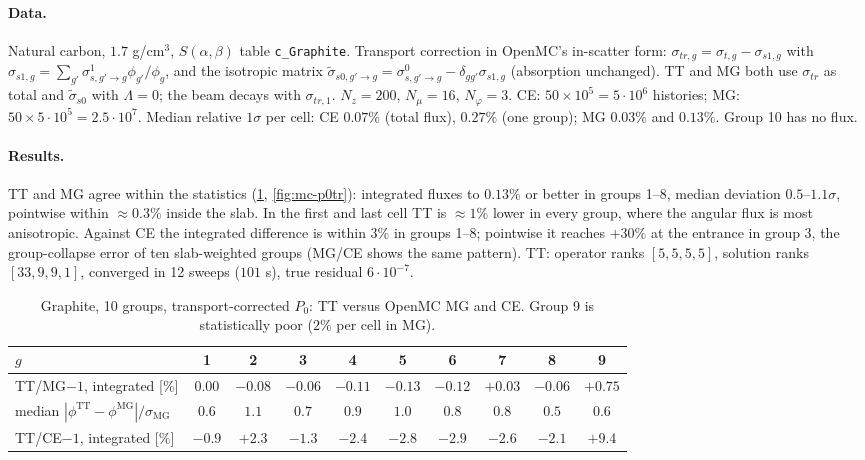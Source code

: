 \documentclass[11pt,a4paper]{article}
\newcommand{\Lmax}{\Lambda}
\newcommand{\code}[1]{\texttt{#1}}
\begin{document}
\paragraph{Data.} Natural carbon, $1.7$ g/cm$^3$, $S(\alpha,\beta)$ table \code{c\_Graphite}. Transport correction in OpenMC's in-scatter form: $\sigma_{tr,g}=\sigma_{t,g}-\sigma_{s1,g}$ with $\sigma_{s1,g}=\sum_{g'}\sigma^1_{s,g'\to g}\phi_{g'}/\phi_g$, and the isotropic matrix $\tilde\sigma_{s0,g'\to g}=\sigma^0_{s,g'\to g}-\delta_{gg'}\sigma_{s1,g}$ (absorption unchanged). TT and MG both use $\sigma_{tr}$ as total and $\tilde\sigma_{s0}$ with $\Lmax=0$; the beam decays with $\sigma_{tr,1}$. $N_z=200$, $N_\mu=16$, $N_\varphi=3$. CE: $50\times10^5=5\cdot10^{6}$ histories; MG: $50\times5\cdot10^5=2.5\cdot10^{7}$. Median relative $1\sigma$ per cell: CE $0.07\%$ (total flux), $0.27\%$ (one group); MG $0.03\%$ and $0.13\%$. Group 10 has no flux.

\paragraph{Results.} TT and MG agree within the statistics (\cref{tab:mc-p0tr}, \cref{fig:mc-p0tr}): integrated fluxes to $0.13\%$ or better in groups 1--8, median deviation $0.5$--$1.1\sigma$, pointwise within $\approx0.3\%$ inside the slab. In the first and last cell TT is $\approx1\%$ lower in every group, where the angular flux is most anisotropic. Against CE the integrated difference is within $3\%$ in groups 1--8; pointwise it reaches $+30\%$ at the entrance in group 3, the group-collapse error of ten slab-weighted groups (MG/CE shows the same pattern). TT: operator ranks $[5,5,5,5]$, solution ranks $[33,9,9,1]$, converged in 12 sweeps ($101$ s), true residual $6\cdot10^{-7}$.

\begin{table}[ht]
\centering\small
\setlength{\tabcolsep}{4pt}
\begin{tabular}{@{}lccccccccc@{}}
\toprule
$g$ & 1 & 2 & 3 & 4 & 5 & 6 & 7 & 8 & 9 \\
\midrule
TT/MG$-1$, integrated [\%] & $0.00$ & $-0.08$ & $-0.06$ & $-0.11$ & $-0.13$ & $-0.12$ & $+0.03$ & $-0.06$ & $+0.75$ \\
median $|\phi^{\mathrm{TT}}-\phi^{\mathrm{MG}}|/\sigma_{\mathrm{MG}}$ & $0.6$ & $1.1$ & $0.7$ & $0.9$ & $1.0$ & $0.8$ & $0.8$ & $0.5$ & $0.6$ \\
TT/CE$-1$, integrated [\%] & $-0.9$ & $+2.3$ & $-1.3$ & $-2.4$ & $-2.8$ & $-2.9$ & $-2.6$ & $-2.1$ & $+9.4$ \\
\bottomrule
\end{tabular}
\caption{Graphite, 10 groups, transport-corrected $P_0$: TT versus OpenMC MG and CE. Group 9 is statistically poor ($2\%$ per cell in MG).}
\label{tab:mc-p0tr}
\end{table}
\end{document}
